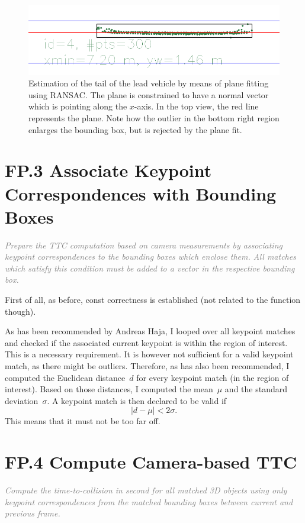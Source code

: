 \documentclass[a4paper]{scrartcl}
\begin{document}
\begin{figure}
	\centering
	\includegraphics[width=0.8\columnwidth]{./img/lidar_ransac_vehicle_tail}
	\caption{Estimation of the tail of the lead vehicle by means of plane
			fitting using RANSAC. The plane is constrained to have
			a normal vector which is pointing along the $x$-axis.
			In the top view, the red line represents the plane.
			Note how the outlier in the bottom right region enlarges
			the bounding box, but is rejected by the plane fit.}
	\label{fig:lidar_ransac}
\end{figure}


\section*{FP.3 Associate Keypoint Correspondences with Bounding Boxes}
\textcolor{gray}{\textit{Prepare the TTC computation based on camera measurements by associating keypoint correspondences to the bounding boxes which enclose them. All matches which satisfy this condition must be added to a vector in the respective bounding box.}}

First of all, as before,
const correctness is established (not related to the
function though).

As has been recommended by Andreas Haja, I looped over all
keypoint matches and checked if the associated current keypoint
is within the region of interest.
This is a necessary requirement.
It is however not sufficient for a valid keypoint match, as
there might be outliers.
Therefore, as has also been recommended, I computed the
Euclidean distance~$d$ for every keypoint match (in the region of interest).
Based on those distances, I computed the mean~$\mu$ and the
standard deviation~$\sigma$.
A keypoint match is then declared to be valid if
\begin{equation}
	|d - \mu| < 2 \sigma.
\end{equation}
This means that it must not be too far off.

\section*{FP.4 Compute Camera-based TTC}
\textcolor{gray}{\textit{Compute the time-to-collision in second for all matched 3D objects using only keypoint correspondences from the matched bounding boxes between current and previous frame.}}
\end{document}
